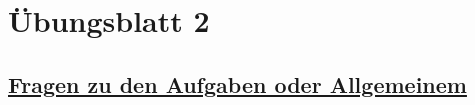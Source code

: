 


\newpage



\chapter*{Übungsblatt 2}


\newpage


\section*{\underline{Fragen zu den Aufgaben oder Allgemeinem}}

~\\

